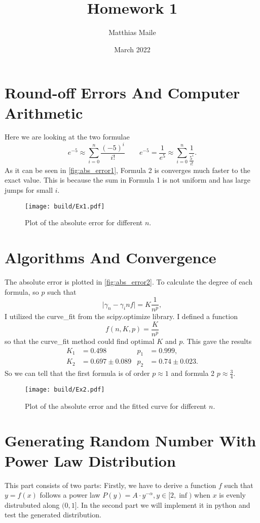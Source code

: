 \documentclass{article}
\author{Matthias Maile}
\date{March 2022}
\title{Homework 1}
\begin{document}
\maketitle
\tableofcontents

\section{Round-off Errors And Computer Arithmetic}
\label{sec:Round-off errors and Computer Arithmetic}
Here we are looking at the two formulae
\[
  e^{-5} \approx \sum_{i=0}^n \frac{(-5)^i}{i!}
  \qquad
  e^{-5} = \frac{1}{e^5} \approx \sum_{i=0}^n \frac{1}{\frac{5^i}{i!}}.
\]
As it can be seen in \autoref{fig:abs_error1}, Formula 2 is converges much faster 
to the exact value. This is because the sum in Formula 1 is not uniform and has 
large jumps for small $i$.

\begin{figure}[H]
	\centering
	\texttt{[image: build/Ex1.pdf]}
	\caption{Plot of the absolute error for different $n$.}
	\label{fig:abs_error1}
\end{figure}

\section{Algorithms And Convergence}
\label{sec:Algorithms and Convergence}
The absolute error is plotted in \autoref{fig:abs_error2}. To calculate the degree of each formula, so 
$p$ such that
\[
  \vert \gamma_n - \gamma_inf \vert = K \frac{1}{n^p},
\]
I utilized the curve\_fit from the scipy.optimize library. I defined a function
\[
  f(n, K, p) = \frac{K}{n^p}
\]
so that the curve\_fit method could find optimal $K$ and $p$. This gave the results
\begin{align}
  K_1 &= 0.498 & p_1 &= 0.999, \\
  K_2 &= 0.697 \pm 0.089 & p_2 &= 0.74 \pm 0.023.
\end{align}
So we can tell that the first formula is of order $p\approx1$ and formula 2 $p\approx \frac{3}{4}$.

\begin{figure}[H]
	\centering
	\texttt{[image: build/Ex2.pdf]}
	\caption{Plot of the absolute error and the fitted curve for different $n$.}
	\label{fig:abs_error2}
\end{figure}


\section{Generating Random Number With Power Law Distribution}
\label{sec:Generating Random Number With Power Law Distribution}
This part consists of two parts: Firstly, we have to derive a function $f$ such that $y = f(x)$ follows
a power law $P(y) = A \cdot y^{-\alpha}, y \in [2, \inf)$ when $x$ is evenly distrubuted along $(0,1]$. 
In the second part we will implement it in python and test the generated distribution.
\end{document}
